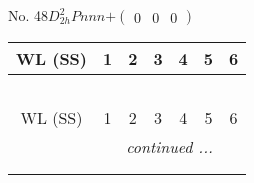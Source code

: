 \documentclass[fleqn,9pt,landscape]{jsarticle}
\begin{document}
\newpage
No. 48\quad$D_{2h}^{2}$\quad$Pnnn$\quad[ orthorhombic ]\quad$+\begin{pmatrix} 0 & 0 & 0 \end{pmatrix}$
\begin{center}
\renewcommand{\arraystretch}{1.2}
\begin{longtable}{ccccccc}
 \hline \hline
WL (SS) & 1 & 2 & 3 & 4 & 5 & 6 \\ \hline \endfirsthead

\multicolumn{6}{l}{\tablename\ \thetable{}} \\
 \hline \hline
WL (SS) & 1 & 2 & 3 & 4 & 5 & 6 \\ \hline \endhead

 \hline \hline
\multicolumn{6}{r}{\footnotesize\it continued ...} \\ \endfoot

 \hline \hline
\multicolumn{6}{r}{} \\ \endlastfoot


\end{longtable}
\end{center}
\end{document}
